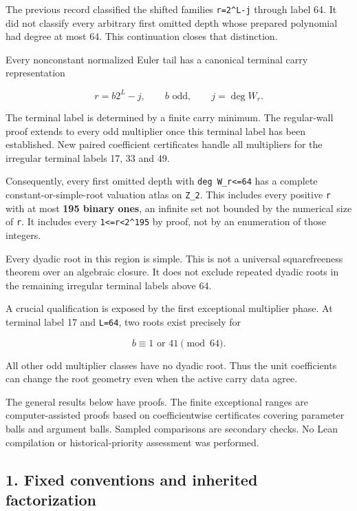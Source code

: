 \documentclass[11pt,letterpaper]{article}
\begin{document}
The previous record classified the shifted families \texttt{r=2\^{}L-j} through label 64. It did not classify every arbitrary first omitted depth whose prepared polynomial had degree at most 64. This continuation closes that distinction.

Every nonconstant normalized Euler tail has a canonical terminal carry representation

\[
\boxed{r=b2^L-j,\qquad b\text{ odd},\qquad j=\deg W_r.} \tag{VI.1}
\]

The terminal label is determined by a finite carry minimum. The regular-wall proof extends to every odd multiplier once this terminal label has been established. New paired coefficient certificates handle all multipliers for the irregular terminal labels 17, 33 and 49.

Consequently, every first omitted depth with \texttt{deg\ W\_r\textless{}=64} has a complete constant-or-simple-root valuation atlas on \texttt{Z\_2}. This includes every positive \texttt{r} with at most \textbf{195 binary ones}, an infinite set not bounded by the numerical size of \texttt{r}. It includes every \texttt{1\textless{}=r\textless{}2\^{}195} by proof, not by an enumeration of those integers.

Every dyadic root in this region is simple. This is not a universal squarefreeness theorem over an algebraic closure. It does not exclude repeated dyadic roots in the remaining irregular terminal labels above 64.

A crucial qualification is exposed by the first exceptional multiplier phase. At terminal label 17 and \texttt{L=64}, two roots exist precisely for

\[
\boxed{b\equiv1\text{ or }41\pmod{64}.} \tag{VI.2}
\]

All other odd multiplier classes have no dyadic root. Thus the unit coefficients can change the root geometry even when the active carry data agree.

The general results below have proofs. The finite exceptional ranges are computer-assisted proofs based on coefficientwise certificates covering parameter balls and argument balls. Sampled comparisons are secondary checks. No Lean compilation or historical-priority assessment was performed.

\subsection{1. Fixed conventions and inherited factorization}\label{fixed-conventions-and-inherited-factorization}
\end{document}
